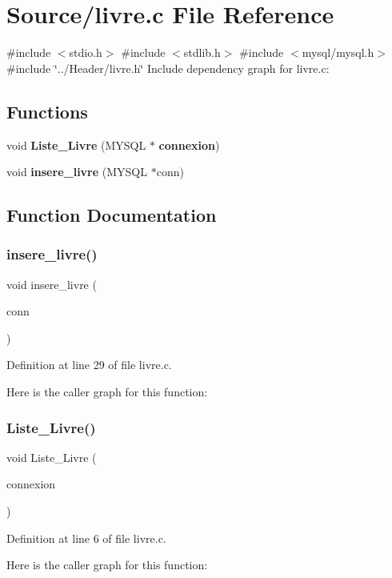\section{Source/livre.c File Reference}
\label{livre_8c}
{\ttfamily \#include $<$stdio.\+h$>$}\newline
{\ttfamily \#include $<$stdlib.\+h$>$}\newline
{\ttfamily \#include $<$mysql/mysql.\+h$>$}\newline
{\ttfamily \#include \char`\"{}../\+Header/livre.\+h\char`\"{}}\newline
Include dependency graph for livre.\+c\+:
\subsection*{Functions}
\begin{DoxyCompactItemize}
\item 
void \textbf{ Liste\+\_\+\+Livre} (M\+Y\+S\+QL $\ast$\textbf{ connexion})
\item 
void \textbf{ insere\+\_\+livre} (M\+Y\+S\+QL $\ast$conn)
\end{DoxyCompactItemize}


\subsection{Function Documentation}
\mbox{\label{livre_8c_a3d5a407c94272ee4bf36d166a6e90133}} 
\subsubsection{insere\+\_\+livre()}
{\footnotesize\ttfamily void insere\+\_\+livre (\begin{DoxyParamCaption}\item[{M\+Y\+S\+QL $\ast$}]{conn }\end{DoxyParamCaption})}



Definition at line 29 of file livre.\+c.

Here is the caller graph for this function\+:
\mbox{\label{livre_8c_a6bc2464abd5d1b31cc86194922200113}} 
\subsubsection{Liste\+\_\+\+Livre()}
{\footnotesize\ttfamily void Liste\+\_\+\+Livre (\begin{DoxyParamCaption}\item[{M\+Y\+S\+QL $\ast$}]{connexion }\end{DoxyParamCaption})}



Definition at line 6 of file livre.\+c.

Here is the caller graph for this function\+:
